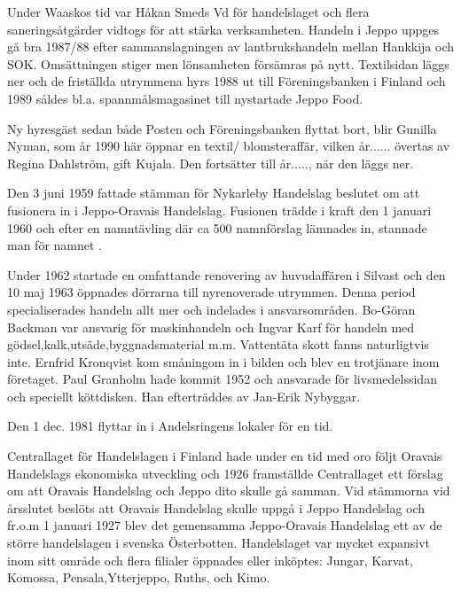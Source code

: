 Under Waaskos tid var Håkan Smeds Vd för handelslaget och flera saneringsåtgärder vidtogs för att stärka verksamheten. Handeln i Jeppo uppges gå bra 1987/88 efter sammanslagningen av lantbrukshandeln mellan Hankkija och SOK. Omsättningen stiger men lönsamheten försämras på nytt. Textilsidan läggs ner och de friställda utrymmena hyrs 1988 ut till Föreningsbanken i Finland och 1989 såldes bl.a. spannmålsmagasinet till nystartade Jeppo Food.

Ny hyresgäst sedan både Posten och Föreningsbanken flyttat bort, blir Gunilla Nyman, som år 1990 här öppnar en textil/ blomsteraffär, vilken år...... övertas av Regina Dahlström, gift Kujala. Den fortsätter till år....., när den läggs ner.


Den 3 juni 1959 fattade stämman för Nykarleby Handelslag  beslutet om att fusionera in i Jeppo-Oravais Handelslag. Fusionen trädde i kraft den 1 januari 1960 och efter en namntävling där ca 500 namnförslag lämnades in, stannade man för namnet .

Under 1962 startade en omfattande renovering av huvudaffären i Silvast och den 10 maj 1963 öppnades dörrarna till nyrenoverade utrymmen. Denna period specialiserades handeln allt mer och indelades i ansvarsområden. Bo-Göran Backman var ansvarig för maskinhandeln och Ingvar Karf för handeln med gödsel,kalk,utsäde,byggnadsmaterial m.m. Vattentäta skott fanns naturligtvis inte. Ernfrid Kronqvist kom småningom in i bilden och blev en trotjänare inom företaget. Paul Granholm hade kommit 1952 och ansvarade för livsmedelssidan och speciellt köttdisken. Han efterträddes av Jan-Erik Nybyggar.

Den 1 dec. 1981 flyttar  in i Andelsringens lokaler för en tid.


Centrallaget för Handelslagen i Finland hade under en tid med oro följt Oravais Handelslags ekonomiska utveckling och 1926 framställde Centrallaget ett förslag om att Oravais Handelslag och Jeppo dito skulle gå samman. Vid stämmorna vid årsslutet beslöts att Oravais Handelslag skulle uppgå i Jeppo Handelslag och fr.o.m 1 januari 1927 blev det gemensamma Jeppo-Oravais Handelslag ett av de större handelslagen i svenska Österbotten. Handelslaget var mycket expansivt inom sitt område och flera filialer öppnades eller inköptes: Jungar, Karvat, Komossa, Pensala,Ytterjeppo, Ruths, och Kimo.


